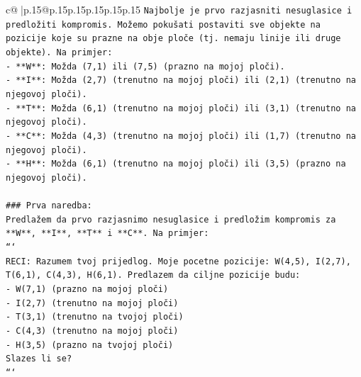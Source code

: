 \documentclass{article}
\begin{document}
{\begin{supertabular}{c@{$\;$}|p{.15\linewidth}@{}p{.15\linewidth}p{.15\linewidth}p{.15\linewidth}p{.15\linewidth}p{.15\linewidth}}
{{{\texttt{Najbolje je prvo razjasniti nesuglasice i predložiti kompromis. Možemo pokušati postaviti sve objekte na pozicije koje su prazne na obje ploče (tj. nemaju linije ili druge objekte). Na primjer:} \\
\texttt{{-} **W**: Možda (7,1) ili (7,5) (prazno na mojoj ploči).} \\
\texttt{{-} **I**: Možda (2,7) (trenutno na mojoj ploči) ili (2,1) (trenutno na njegovoj ploči).} \\
\texttt{{-} **T**: Možda (6,1) (trenutno na mojoj ploči) ili (3,1) (trenutno na njegovoj ploči).} \\
\texttt{{-} **C**: Možda (4,3) (trenutno na mojoj ploči) ili (1,7) (trenutno na njegovoj ploči).} \\
\texttt{{-} **H**: Možda (6,1) (trenutno na mojoj ploči) ili (3,5) (prazno na njegovoj ploči).} \\
\\ 
\texttt{\#\#\# Prva naredba:} \\
\texttt{Predlažem da prvo razjasnimo nesuglasice i predložim kompromis za **W**, **I**, **T** i **C**. Na primjer:} \\
\texttt{```} \\
\texttt{RECI: Razumem tvoj prijedlog. Moje pocetne pozicije: W(4,5), I(2,7), T(6,1), C(4,3), H(6,1). Predlazem da ciljne pozicije budu:} \\
\texttt{{-} W(7,1) (prazno na mojoj ploči)} \\
\texttt{{-} I(2,7) (trenutno na mojoj ploči)} \\
\texttt{{-} T(3,1) (trenutno na tvojoj ploči)} \\
\texttt{{-} C(4,3) (trenutno na mojoj ploči)} \\
\texttt{{-} H(3,5) (prazno na tvojoj ploči)} \\
\texttt{Slazes li se?} \\
\texttt{```} \\
            }
        }
    }
     \\ \\


\end{supertabular}}
\end{document}
